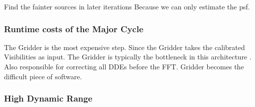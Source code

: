 Find the fainter sources in later iterations
Because we can only estimate the psf.

\subsubsection{Runtime costs of the Major Cycle}

The Gridder is the most expensive step. 
Since the Gridder takes the calibrated Visibilities as input. The Gridder is typically the bottleneck in this architecture \cite{skastuff}.
Also responsible for correcting all DDEs before the FFT. Gridder becomes the difficult piece of software.


\subsubsection{High Dynamic Range}
